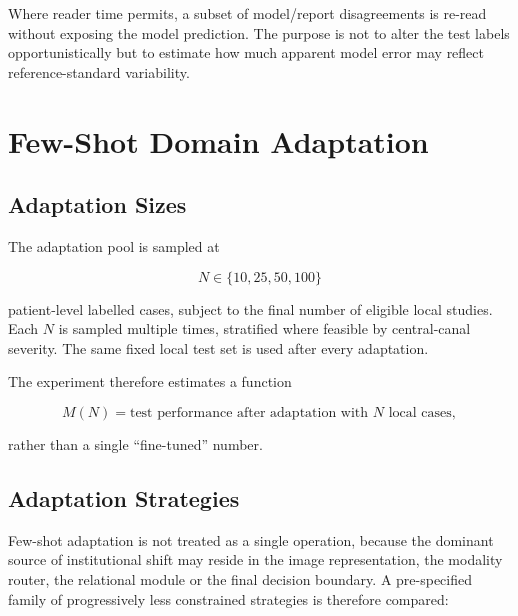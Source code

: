 Where reader time permits, a subset of model/report disagreements is re-read
without exposing the model prediction. The purpose is not to alter the test
labels opportunistically but to estimate how much apparent model error may
reflect reference-standard variability.

\section{Few-Shot Domain Adaptation}
\label{sec:method-adaptation}

\subsection{Adaptation Sizes}
\label{sec:method-adaptation-sizes}

The adaptation pool is sampled at

\[
N\in\{10,25,50,100\}
\]

patient-level labelled cases, subject to the final number of eligible local
studies. Each $N$ is sampled multiple times, stratified where feasible by
central-canal severity. The same fixed local test set is used after every
adaptation.

The experiment therefore estimates a function

\begin{equation}
M(N)=
\text{test performance after adaptation with }N\text{ local cases},
\label{eq:adaptation-curve}
\end{equation}

rather than a single ``fine-tuned'' number.

\subsection{Adaptation Strategies}
\label{sec:method-adaptation-strategies}

Few-shot adaptation is not treated as a single operation, because the dominant
source of institutional shift may reside in the image representation, the
modality router, the relational module or the final decision boundary. A
pre-specified family of progressively less constrained strategies is therefore
compared:

